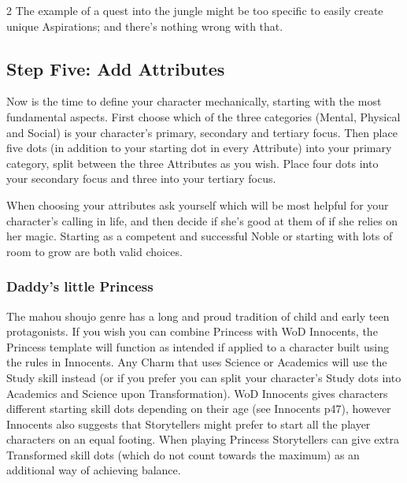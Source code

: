 \begin{multicols}{2}
The example of a quest into the jungle might be too specific to easily create unique Aspirations; and there's nothing wrong with that. 

\subsection*{Step Five: Add Attributes}

Now is the time to define your character mechanically, starting with the most fundamental aspects. First choose which of the three categories (Mental, Physical and Social) is your character's primary, secondary and tertiary focus. Then place five dots (in addition to your starting dot in every Attribute) into your primary category, split between the three Attributes as you wish. Place four dots into your secondary focus and three into your tertiary focus. 

When choosing your attributes ask yourself which will be most helpful for your character's calling in life, and then decide if she's good at them of if she relies on her magic. Starting as a competent and successful Noble or starting with lots of room to grow are both valid choices. 


\bigsidebarstart

\subsubsection*{Daddy's little Princess}

The mahou shoujo genre has a long and proud tradition of child and early teen protagonists. If you wish you can combine Princess with WoD Innocents, the Princess template will function as intended if applied to a character built using the rules in Innocents. Any Charm that uses Science or Academics will use the Study skill instead (or if you prefer you can split your character's Study dots into Academics and Science upon Transformation). WoD Innocents gives characters different starting skill dots depending on their age (see Innocents p47), however Innocents also suggests that Storytellers might prefer to start all the player characters on an equal footing. When playing Princess Storytellers can give extra Transformed skill dots (which do not count towards the maximum) as an additional way of achieving balance. 


\end{multicols}
